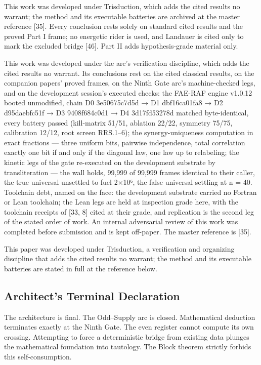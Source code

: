 \documentclass[10pt]{article}
\renewcommand{\_}{\origunderscore\allowbreak}
\begin{document}
This work was developed under Trisduction, which adds the cited results
no warrant; the method and its executable batteries are archived at the
master reference {[}35{]}. Every conclusion rests solely on standard
cited results and the proved Part I frame; no energetic rider is used,
and Landauer is cited only to mark the excluded bridge {[}46{]}. Part II
adds hypothesis-grade material only.

This work was developed under the arc's verification discipline, which
adds the cited results no warrant. Its conclusions rest on the cited
classical results, on the companion papers' proved frames, on the Ninth
Gate arc's machine-checked legs, and on the development session's
executed checks: the FAE-RAF engine v1.0.12 booted unmodified, chain D0
3e50675c7d5d → D1 dbf16ca01fa8 → D2 d95daebfc51f → D3 9408f684c0d1 → D4
3d17fd53278d matched byte-identical, every battery passed (kill-matrix
51/51, ablation 22/22, symmetry 75/75, calibration 12/12, root screen
RRS.1--6); the synergy-uniqueness computation in exact fractions ---
three uniform bits, pairwise independence, total correlation exactly one
bit if and only if the diagonal law, one law up to relabeling; the
kinetic legs of the gate re-executed on the development substrate by
transliteration --- the wall holds, 99,999 of 99,999 frames identical to
their caller, the true universal unsettled to fuel 2×10⁶, the false
universal settling at n = 40. Toolchain debt, named on the face: the
development substrate carried no Fortran or Lean toolchain; the Lean
legs are held at inspection grade here, with the toolchain receipts of
{[}33, 8{]} cited at their grade, and replication is the second leg of
the stated order of work. An internal adversarial review of this work
was completed before submission and is kept off-paper. The master
reference is {[}35{]}.

This paper was developed under Trisduction, a verification and
organizing discipline that adds the cited results no warrant; the method
and its executable batteries are stated in full at the reference below.

\hypertarget{architects-terminal-declaration}{%
\subsection{Architect's Terminal
Declaration}\label{architects-terminal-declaration}}

The architecture is final. The Odd--Supply arc is closed. Mathematical
deduction terminates exactly at the Ninth Gate. The even register cannot
compute its own crossing. Attempting to force a deterministic bridge
from existing data plunges the mathematical foundation into tautology.
The Block theorem strictly forbids this self-consumption.
\end{document}
